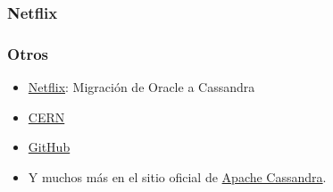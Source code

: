 \documentclass[11pt,a4paper]{article}
\begin{document}
\subsubsection{Netflix}

\subsubsection{Otros}

\begin{itemize}
	\item \href{http://www.slideshare.net/adrianco/migrating-netflix-from-oracle-to-global-cassandra}{Netflix}: Migración de Oracle a Cassandra
    \item \href{http://indico.cern.ch/event/93877/session/14/material/poster/0?contribId=19}{CERN}
	\item \href{http://live-pc-development.pantheon.io/blog/analytics-at-github-with-apache-cassandra/}{GitHub}
	\item Y muchos más en el sitio oficial de \href{http://cassandra.apache.org/}{Apache Cassandra}.
\end{itemize}
\end{document}
